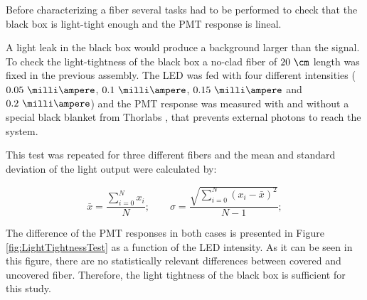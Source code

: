 
Before characterizing a fiber several tasks had to be performed to check that the black box is light-tight enough and the PMT response is lineal.


A light leak in the black box would produce a background larger than the signal. To check the light-tightness of the black box a no-clad fiber of $20~\cm$ length was fixed in the previous assembly. The LED was fed with four different intensities ($0.05~\milli\ampere$, $0.1~\milli\ampere$, $0.15~\milli\ampere$ and $0.2~\milli\ampere$) and the PMT response was measured with and without a special black blanket from Thorlabs \cite{BlackBlancket}, that prevents external photons to reach the system. 

This test was repeated for three different fibers and the mean and standard deviation of the light output were calculated by:

\begin{equation}
\bar{x}=\frac{\sum_{i=0}^{N}x_i}{N}; \qquad \sigma = \frac{\sqrt{\sum_{i=0}^{N}(x_i-\bar{x})^2}}{N-1};
\label{eq:MeanAndStandardDesviation}
\end{equation}

The difference of the PMT responses in both cases is presented in Figure \ref{fig:LightTightnessTest} as a function of the LED intensity. As it can be seen in this figure, there are no statistically relevant differences between covered and uncovered fiber. Therefore, the light tightness of the black box is sufficient for this study.



